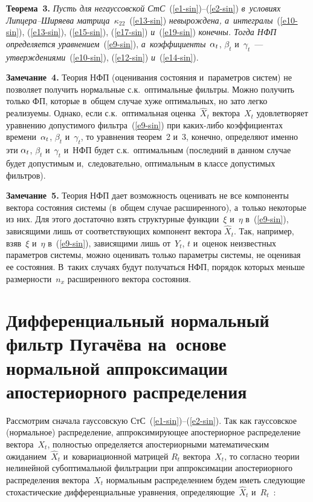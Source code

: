 \begin{multicols}{2}
\smallskip

\noindent
\textbf{Теорема~3.} \textit{Пусть для негауссовской СтС}~(\ref{e1-sin})--(\ref{e2-sin}) \textit{в~условиях Лип\-це\-ра--Ши\-ря\-ева  матрица~$\kappa_{22}$}~(\ref{e13-sin}) \textit{невырождена,
а~интегралы}~(\ref{e10-sin}), (\ref{e13-sin}), (\ref{e15-sin}), (\ref{e17-sin}) \textit{и}~(\ref{e19-sin}) \textit{конечны.
Тогда НФП определяется уравнением}~(\ref{e9-sin}), \textit{а~коэффициенты}~$\alpha_t$, $\beta_t$ и~$\gamma_t$~---
\textit{утверждениями}~(\ref{e10-sin}), (\ref{e12-sin}) \textit{и}~(\ref{e14-sin}).

\smallskip

\noindent
\textbf{Замечание~4.}
Теория НФП (оценивания состояния и~параметров систем) не позволяет получить нормальные с.к.\ оптимальные фильтры. Можно получить только ФП,
которые в~общем случае хуже оптимальных, но зато легко реализуемы.
Однако, если с.к.\ оптимальная оценка~$\hat{X}_t$ вектора~$X_t$
удовлетворяет уравнению допустимого фильтра~(\ref{e9-sin}) при ка\-ких-ли\-бо коэффициентах времени~$\alpha_t$,
$\beta_t$ и~$\gamma_t$, то уравнения теорем~2 и~3, конечно, определяют именно эти $\alpha_t$, $\beta_t$ и~$\gamma_t$ и~НФП будет  с.к.\ оптимальным
(последний в данном случае будет допустимым и,~следовательно,
оптимальным в классе допустимых фильтров).

\smallskip

\noindent
\textbf{Замечание~5.}
Теория НФП дает возможность оценивать не все компоненты вектора состояния системы (в~общем случае расширенного), а~только некоторые из них. Для этого достаточно
взять структурные функции~$\xi$ и~$\eta$ в~(\ref{e9-sin}), зависящими
лишь от соответствующих компонент вектора  $\hat{X}_t$. Так, например,
взяв~$\xi$ и~$\eta$ в~(\ref{e9-sin}), зависящими лишь от~$Y_t$, $t$ и~оценок неизвестных параметров системы, можно оценивать только
параметры системы, не оценивая ее состояния. В~таких случаях будут
получаться НФП, порядок которых меньше размерности~$n_x$
расширенного вектора состояния.


\section{Дифференциальный нормальный  фильтр Пугачёва на~основе нормальной аппроксимации апостериорного распределения}

Рассмотрим сначала гауссовскую СтС~(\ref{e1-sin})--(\ref{e2-sin}).
Так как гауссовское (нормальное) распределение, аппроксимирующее
апостериорное распределение вектора~$X_t$, полностью определяется
апостериорными математическим ожиданием~$\hat{X}_t$ и~ковариационной матрицей  $R_t$ вектора~$X_t$, то согласно теории нелинейной субоптимальной фильтрации при аппроксимации апостериорного распределения вектора~$X_t$ нормальным
распределением будем иметь следующие стохастические дифференциальные уравнения,
определяющие~$\hat{X}_t$ и~$R_t$~\cite{1-sin}:


\end{multicols}
